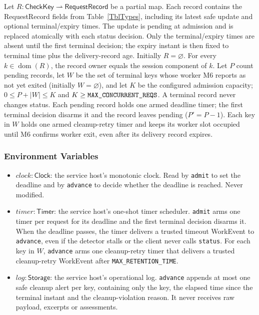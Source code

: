 \documentclass[12pt, titlepage]{article}
\newcommand{\ty}[1]{\textsf{#1}}
\newcommand{\key}{\ty{CheckKey}}
\newcommand{\Const}[1]{\texttt{#1}}
\begin{document}
Let $R:\key\rightharpoonup\ty{RequestRecord}$ be a partial map. Each record contains the RequestRecord fields from Table~\ref{TblTypes}, including its latest safe update and optional terminal/expiry times. The update is pending at admission and is replaced atomically with each status decision. Only the terminal/expiry times are absent until the first terminal decision; the expiry instant is then fixed to terminal time plus the delivery-record age. Initially $R=\varnothing$. For every $k\in\operatorname{dom}(R)$, the record owner equals the session component of $k$. Let $P$ count pending records, let $W$ be the set of terminal keys whose worker M6 reports as not yet exited (initially $W=\varnothing$), and let $K$ be the configured admission capacity; $0\le P+|W|\le K$ and $K\ge\Const{MAX\_\allowbreak{}CONCURRENT\_\allowbreak{}REQS}$. A terminal record never changes status. Each pending record holds one armed deadline timer; the first terminal decision disarms it and the record leaves pending ($P'=P-1$). Each key in $W$ holds one armed cleanup-retry timer and keeps its worker slot occupied until M6 confirms worker exit, even after its delivery record expires.

\subsubsection{Environment Variables}

\begin{itemize}
\item $\mathit{clock}:\ty{Clock}$: the service host's monotonic clock. Read by \texttt{admit} to set the deadline and by \texttt{advance} to decide whether the deadline is reached. Never modified.
\item $\mathit{timer}:\ty{Timer}$: the service host's one-shot timer scheduler. \texttt{admit} arms one timer per request for its deadline and the first terminal decision disarms it. When the deadline passes, the timer delivers a trusted timeout \ty{WorkEvent} to \texttt{advance}, even if the detector stalls or the client never calls \texttt{status}. For each key in $W$, \texttt{advance} arms one cleanup-retry timer that delivers a trusted cleanup-retry \ty{WorkEvent} after \Const{MAX\_\allowbreak{}RETENTION\_\allowbreak{}TIME}.
\item $\mathit{log}:\ty{Storage}$: the service host's operational log. \texttt{advance} appends at most one safe cleanup alert per key, containing only the key, the elapsed time since the terminal instant and the cleanup-violation reason. It never receives raw payload, excerpts or assessments.
\end{itemize}
\end{document}
